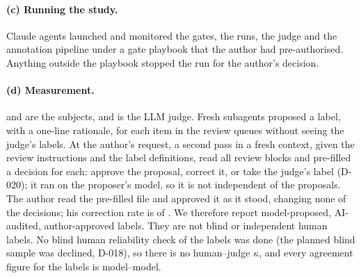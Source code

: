 \paragraph{(c) Running the study.}
Claude agents launched and monitored the gates, the runs, the judge and the annotation pipeline under a gate playbook that the author had pre-authorised.
Anything outside the playbook stopped the run for the author's decision.

\paragraph{(d) Measurement.}
\wtthDesignModelHaikuName{} and \wtthDesignModelSonnetName{} are the subjects, and \wtthDesignModelJudgeName{} is the LLM judge.
Fresh \wtthDesignModelAnnotatorName{} subagents proposed a label, with a one-line rationale, for each item in the review queues without seeing the judge's labels.
At the author's request, a second \wtthDesignModelAnnotatorName{} pass in a fresh context, given the review instructions and the label definitions, read all \wtthReviewReviewed{} review blocks and pre-filled a decision for each: approve the proposal, correct it, or take the judge's label (D-020); it ran on the proposer's model, so it is not independent of the proposals.
The author read the pre-filled file and approved it as it stood, changing none of the \wtthReviewReviewed{} decisions; his correction rate is \wtthDesignReviewAuthorChanged{} of \wtthReviewReviewed.
We therefore report model-proposed, AI-audited, author-approved labels.
They are not blind or independent human labels.
No blind human reliability check of the labels was done (the planned blind sample was declined, D-018), so there is no human--judge $\kappa$, and every agreement figure for the labels is model--model.


